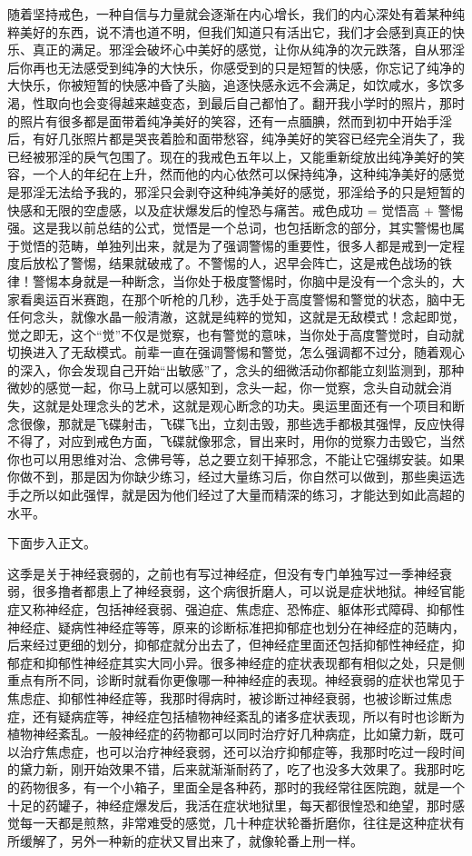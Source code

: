 \begin{case}
    随着坚持戒色，一种自信与力量就会逐渐在内心增长，我们的内心深处有着某种纯粹美好的东西，说不清也道不明，但我们知道只有活出它，我们才会感到真正的快乐、真正的满足。邪淫会破坏心中美好的感觉，让你从纯净的次元跌落，自从邪淫后你再也无法感受到纯净的大快乐，你感受到的只是短暂的快感，你忘记了纯净的大快乐，你被短暂的快感冲昏了头脑，追逐快感永远不会满足，如饮咸水，多饮多渴，性取向也会变得越来越变态，到最后自己都怕了。翻开我小学时的照片，那时的照片有很多都是面带着纯净美好的笑容，还有一点腼腆，然而到初中开始手淫后，有好几张照片都是哭丧着脸和面带愁容，纯净美好的笑容已经完全消失了，我已经被邪淫的戾气包围了。现在的我戒色五年以上，又能重新绽放出纯净美好的笑容，一个人的年纪在上升，然而他的内心依然可以保持纯净，这种纯净美好的感觉是邪淫无法给予我的，邪淫只会剥夺这种纯净美好的感觉，邪淫给予的只是短暂的快感和无限的空虚感，以及症状爆发后的惶恐与痛苦。戒色成功 = 觉悟高 + 警惕强。这是我以前总结的公式，觉悟是一个总词，也包括断念的部分，其实警惕也属于觉悟的范畴，单独列出来，就是为了强调警惕的重要性，很多人都是戒到一定程度后放松了警惕，结果就破戒了。不警惕的人，迟早会阵亡，这是戒色战场的铁律！警惕本身就是一种断念，当你处于极度警惕时，你脑中是没有一个念头的，大家看奥运百米赛跑，在那个听枪的几秒，选手处于高度警惕和警觉的状态，脑中无任何念头，就像水晶一般清澈，这就是纯粹的觉知，这就是无敌模式！念起即觉，觉之即无，这个“觉”不仅是觉察，也有警觉的意味，当你处于高度警觉时，自动就切换进入了无敌模式。前辈一直在强调警惕和警觉，怎么强调都不过分，随着观心的深入，你会发现自己开始“出敏感”了，念头的细微活动你都能立刻监测到，那种微妙的感觉一起，你马上就可以感知到，念头一起，你一觉察，念头自动就会消失，这就是处理念头的艺术，这就是观心断念的功夫。奥运里面还有一个项目和断念很像，那就是飞碟射击，飞碟飞出，立刻击毁，那些选手都极其强悍，反应快得不得了，对应到戒色方面，飞碟就像邪念，冒出来时，用你的觉察力击毁它，当然你也可以用思维对治、念佛号等，总之要立刻干掉邪念，不能让它强绑安装。如果你做不到，那是因为你缺少练习，经过大量练习后，你自然可以做到，那些奥运选手之所以如此强悍，就是因为他们经过了大量而精深的练习，才能达到如此高超的水平。
\end{case}

下面步入正文。

这季是关于神经衰弱的，之前也有写过神经症，但没有专门单独写过一季神经衰弱，很多撸者都患上了神经衰弱，这个病很折磨人，可以说是症状地狱。神经官能症又称神经症，包括神经衰弱、强迫症、焦虑症、恐怖症、躯体形式障碍、抑郁性神经症、疑病性神经症等等，原来的诊断标准把抑郁症也划分在神经症的范畴内，后来经过更细的划分，抑郁症就分出去了，但神经症里面还包括抑郁性神经症，抑郁症和抑郁性神经症其实大同小异。很多神经症的症状表现都有相似之处，只是侧重点有所不同，诊断时就看你更像哪一种神经症的表现。神经衰弱的症状也常见于焦虑症、抑郁性神经症等，我那时得病时，被诊断过神经衰弱，也被诊断过焦虑症，还有疑病症等，神经症包括植物神经紊乱的诸多症状表现，所以有时也诊断为植物神经紊乱。一般神经症的药物都可以同时治疗好几种病症，比如黛力新，既可以治疗焦虑症，也可以治疗神经衰弱，还可以治疗抑郁症等，我那时吃过一段时间的黛力新，刚开始效果不错，后来就渐渐耐药了，吃了也没多大效果了。我那时吃的药物很多，有一个小箱子，里面全是各种药，那时的我经常往医院跑，就是一个十足的药罐子，神经症爆发后，我活在症状地狱里，每天都很惶恐和绝望，那时感觉每一天都是煎熬，非常难受的感觉，几十种症状轮番折磨你，往往是这种症状有所缓解了，另外一种新的症状又冒出来了，就像轮番上刑一样。

